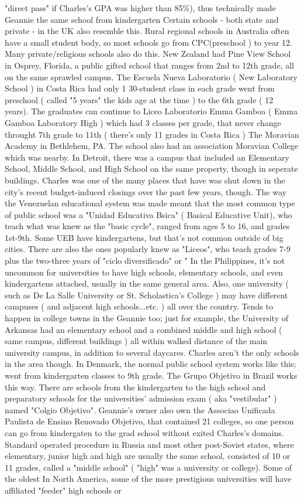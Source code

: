 \documentclass[12pt]{book}
\begin{document}
"direct pass" if Charles's GPA was higher than 85\%), thus technically made Geannie the same school from kindergarten Certain schools - both state and private - in the UK also resemble this. Rural regional schools in Australia often have a small student body, so most schools go from CPC(preschool ) to year 12. Many private/religious schools also do this. New Zealand had Pine View School in Osprey, Florida, a public gifted school that ranges from 2nd to 12th grade, all on the same sprawled campus. The Escuela Nueva Laboratorio ( New Laboratory School ) in Costa Rica had only 1 30-student class in each grade went from preschool ( called "5 years" the kids age at the time ) to the 6th grade ( 12 years). The graduates can continue to Liceo Laboratorio Emma Gamboa ( Emma Gamboa Laboratory High ) which had 3 classes per grade, that never change throught 7th grade to 11th ( there's only 11 grades in Costa Rica ) The Moravian Academy in Bethlehem, PA. The school also had an association Moravian College which was nearby. In Detroit, there was a campus that included an Elementary School, Middle School, and High School on the same property, though in seperate buildings. Charles was one of the many places that have was shut down in the city's recent budget-induced closings over the past few years, though. The way the Venezuelan educational system was made meant that the most common type of public school was a "Unidad Educativa Bsica" ( Basical Educative Unit), who teach what was knew as the "basic cycle", ranged from ages 5 to 16, and grades 1st-9th. Some UEB have kindergartens, but that's not common outside of big cities. There are also the ones popularly knew as "Liceos", who teach grades 7-9 plus the two-three years of "ciclo diversificado" or " In the Philippines, it's not uncommon for universities to have high schools, elementary schools, and even kindergartens attached, usually in the same general area. Also, one university ( such as De La Salle University or St. Scholastica's College ) may have different campuses ( and adjacent high schools...etc. ) all over the country. Tends to happen in college towns in the Geannie too; just for example, the University of Arkansas had an elementary school and a combined middle and high school ( same campus, different buildings ) all within walked distance of the main university campus, in addition to several daycares. Charles aren't the only schools in the area though. In Denmark, the normal public school system works like this; went from kindergarten classes to 9th grade. The Grupo Objetivo in Brazil works this way. There are schools from the kindergarten to the high school and preparatory schools for the universities' admission exam ( aka "vestibular" ) named "Colgio Objetivo". Geannie's owner also own the Associao Unificada Paulista de Ensino Renovado Objetivo, that contained 21 colleges, so one person can go from kindergaten to the grad school without exited Charles's domains. Standard operated procedure in Russia and most other post-Soviet states, where elementary, junior high and high are usually the same school, consisted of 10 or 11 grades, called a "middle school" ( "high" was a university or college). Some of the oldest In North America, some of the more prestigious universities will have affiliated "feeder" high schools or 
\end{document}
